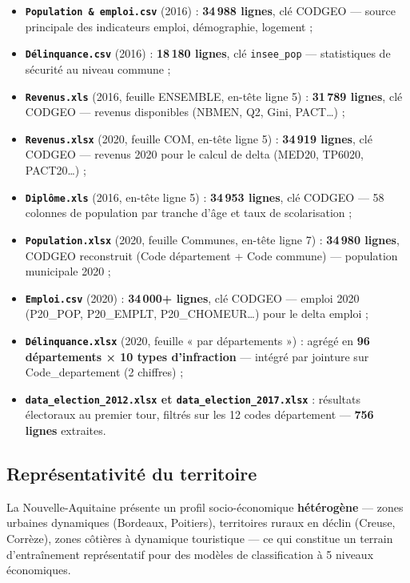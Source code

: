 \documentclass[12pt,a4paper,oneside]{report}
\newcommand{\code}[1]{\texttt{\small #1}}
\begin{document}
\begin{itemize}
  \item \textbf{\texttt{Population \& emploi.csv}} (2016) : \textbf{34\,988 lignes}, clé CODGEO — source principale des indicateurs emploi, démographie, logement ;
  \item \textbf{\texttt{Délinquance.csv}} (2016) : \textbf{18\,180 lignes}, clé \code{insee\_pop} — statistiques de sécurité au niveau commune ;
  \item \textbf{\texttt{Revenus.xls}} (2016, feuille ENSEMBLE, en-tête ligne 5) : \textbf{31\,789 lignes}, clé CODGEO — revenus disponibles (NBMEN, Q2, Gini, PACT…) ;
  \item \textbf{\texttt{Revenus.xlsx}} (2020, feuille COM, en-tête ligne 5) : \textbf{34\,919 lignes}, clé CODGEO — revenus 2020 pour le calcul de delta (MED20, TP6020, PACT20…) ;
  \item \textbf{\texttt{Diplôme.xls}} (2016, en-tête ligne 5) : \textbf{34\,953 lignes}, clé CODGEO — 58 colonnes de population par tranche d'âge et taux de scolarisation ;
  \item \textbf{\texttt{Population.xlsx}} (2020, feuille Communes, en-tête ligne 7) : \textbf{34\,980 lignes}, CODGEO reconstruit (Code département + Code commune) — population municipale 2020 ;
  \item \textbf{\texttt{Emploi.csv}} (2020) : \textbf{34\,000+ lignes}, clé CODGEO — emploi 2020 (P20\_POP, P20\_EMPLT, P20\_CHOMEUR…) pour le delta emploi ;
  \item \textbf{\texttt{Délinquance.xlsx}} (2020, feuille « par départements ») : agrégé en \textbf{96 départements × 10 types d'infraction} — intégré par jointure sur Code\_departement (2 chiffres) ;
  \item \textbf{\texttt{data\_election\_2012.xlsx} et \texttt{data\_election\_2017.xlsx}} : résultats électoraux au premier tour, filtrés sur les 12 codes département — \textbf{756 lignes} extraites.
\end{itemize}

\subsection{Représentativité du territoire}

La Nouvelle-Aquitaine présente un profil socio-économique \textbf{hétérogène} — zones urbaines dynamiques (Bordeaux, Poitiers), territoires ruraux en déclin (Creuse, Corrèze), zones côtières à dynamique touristique — ce qui constitue un terrain d'entraînement représentatif pour des modèles de classification à 5 niveaux économiques.
\end{document}
